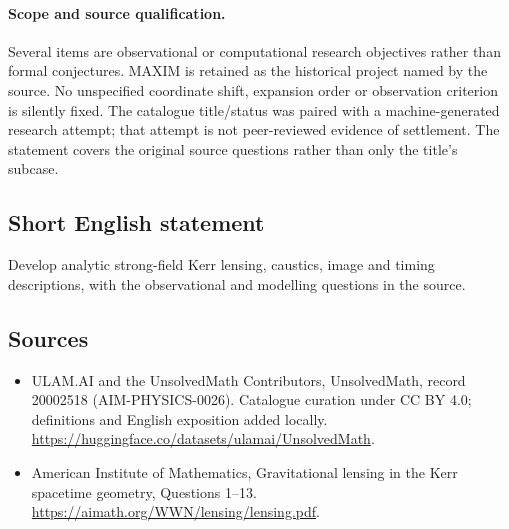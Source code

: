\documentclass[11pt]{article}
\begin{document}
\paragraph{Scope and source qualification.}Several items are observational or computational research objectives rather than formal conjectures. MAXIM is retained as the historical project named by the source. No unspecified coordinate shift, expansion order or observation criterion is silently fixed. The catalogue title/status was paired with a machine-generated research attempt; that attempt is not peer-reviewed evidence of settlement. The statement covers the original source questions rather than only the title’s subcase.
\subsection{Short English statement}
Develop analytic strong-field Kerr lensing, caustics, image and timing descriptions, with the observational and modelling questions in the source.
\subsection{Sources}
\begin{itemize}
\item[\hypertarget{source:20002518:1}{S1}] ULAM.AI and the UnsolvedMath Contributors, UnsolvedMath, record 20002518 (AIM-PHYSICS-0026). Catalogue curation under CC BY 4.0; definitions and English exposition added locally.
\url{https://huggingface.co/datasets/ulamai/UnsolvedMath}.
\item[\hypertarget{source:20002518:2}{S2}] American Institute of Mathematics, Gravitational lensing in the Kerr spacetime geometry, Questions 1–13.
\url{https://aimath.org/WWN/lensing/lensing.pdf}.
\end{itemize}
\label{end:20002518}
\end{document}
